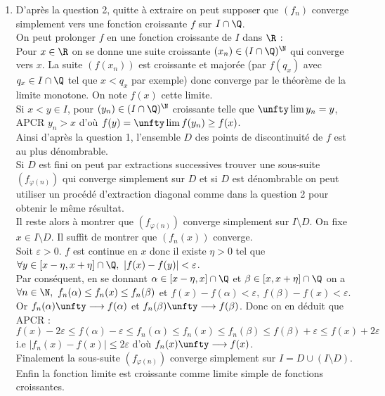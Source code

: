 \documentclass{book}
\begin{document}
\begin{enumerate}[leftmargin=*]
		Soit $q_i\in I\cap \Q$. Fixons $\varepsilon>0$.\\
		On sait que $\forall k\geq i,\ \exists \ell_k\in \R,\ \exists N_k\in \N,\ \forall n\geq N_k,\ |f_{\psi_k(n)}(q_i)-\ell_k|<\varepsilon$.\\
		Alors $\forall n\geq \max(i,N_i),\ |f_{\varphi(n)}(q_i)-\ell_i|=|f_{\psi_n(n)}(q_i)-\ell_i|<\varepsilon$.\\
		Ainsi $(f_{\varphi(n)})$ converge simplement vers la fonction $f:q_i\mapsto \ell_i$ sur $I\cap \Q$.\\
		Enfin $f$ est croissante comme limite simple de fonctions croissantes.
		\item D'après la question 2, quitte à extraire on peut supposer que $(f_n)$ converge simplement vers une fonction croissante $f$ sur $I\cap \Q$.\\
		On peut prolonger $f$ en une fonction croissante de $I$ dans $\R$ :\\
		Pour $x\in \R$ on se donne une suite croissante $(x_n)\in (I\cap \Q)^\N$ qui converge vers $x$. La suite $(f(x_n))$ est croissante et majorée (par $f(q_x)$ avec $q_x\in I\cap \Q$ tel que $x<q_x$ par exemple) donc converge par le théorème de la limite monotone. On note $f(x)$ cette limite.\\
		Si $x<y\in I$, pour $(y_n)\in (I\cap \Q)^\N$ croissante telle que $\unfty\lim y_n=y$, APCR $y_n>x$ d'où $f(y)=\unfty\lim f(y_n)\geq f(x)$.\\
		Ainsi d'après la question 1, l'ensemble $D$ des points de discontinuité de $f$ est au plus dénombrable.\\
		Si $D$ est fini on peut par extractions successives trouver une sous-suite $(f_{\varphi(n)})$ qui converge simplement sur $D$ et si $D$ est dénombrable on peut utiliser un procédé d'extraction diagonal comme dans la question 2 pour obtenir le même résultat.\\
		Il reste alors à montrer que $(f_{\varphi(n)})$ converge simplement sur $I\setminus D$. On fixe $x\in I\setminus D$. Il suffit de montrer que $(f_n(x))$ converge.\\
		Soit $\varepsilon>0$. $f$ est continue en $x$ donc il existe $\eta>0$ tel que $\forall y\in [x-\eta,x+\eta]\cap \Q,\ |f(x)-f(y)|<\varepsilon$.\\
		Par conséquent, en se donnant $\alpha\in [x-\eta,x]\cap \Q$ et $\beta\in [x,x+\eta]\cap \Q$ on a $\forall n\in \N,\ f_n(\alpha)\leq f_n(x)\leq f_n(\beta)$ et $f(x)-f(\alpha)<\varepsilon,\ f(\beta)-f(x)<\varepsilon$.\\
		Or $f_n(\alpha)\unfty\longrightarrow f(\alpha)$ et $f_n(\beta)\unfty\longrightarrow f(\beta)$. Donc on en déduit que APCR :
		$$f(x)-2\varepsilon\leq f(\alpha)-\varepsilon\leq f_n(\alpha)\leq f_n(x)\leq f_n(\beta)\leq f(\beta)+\varepsilon\leq f(x)+2\varepsilon$$
		i.e $|f_n(x)-f(x)|\leq 2\varepsilon$ d'où $f_n(x)\unfty\longrightarrow f(x)$.\\
		Finalement la sous-suite $(f_{\varphi(n)})$ converge simplement sur $I=D\cup (I\setminus D)$. Enfin la fonction limite est croissante comme limite simple de fonctions croissantes.
	\end{enumerate}
	
\end{document}
